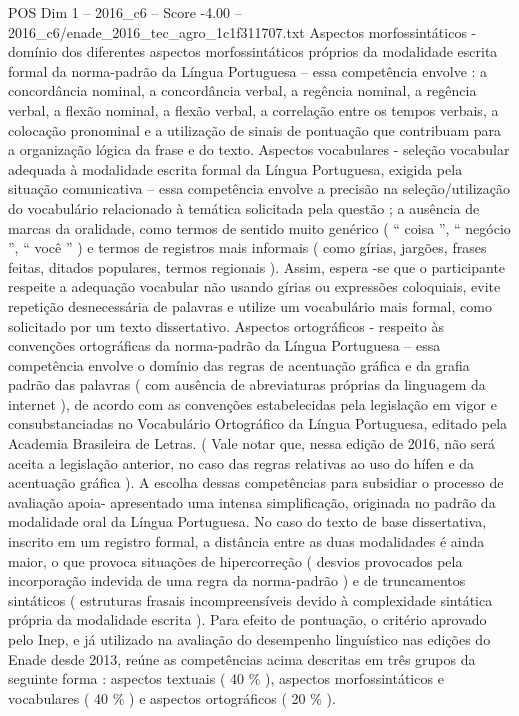 \begin{textsample}{POS Dim 1 – 2016\_c6 – Score -4.00 – 2016\_c6/enade\_2016\_tec\_agro\_1c1f311707.txt}
Aspectos morfossintáticos - domínio dos diferentes aspectos morfossintáticos próprios da modalidade escrita formal da norma-padrão da Língua Portuguesa – essa competência envolve : a concordância nominal, a concordância verbal, a regência nominal, a regência verbal, a flexão nominal, a flexão verbal, a correlação entre os tempos verbais, a colocação pronominal e a utilização de sinais de pontuação que contribuam para a organização lógica da frase e do texto.
Aspectos vocabulares - seleção vocabular adequada à modalidade escrita formal da Língua Portuguesa, exigida pela situação comunicativa – essa competência envolve a precisão na seleção/utilização do vocabulário relacionado à temática solicitada pela questão ; a ausência de marcas da oralidade, como termos de sentido muito genérico ( “ coisa ”, “ negócio ”, “ você ” ) e termos de registros mais informais ( como gírias, jargões, frases feitas, ditados populares, termos regionais ).
Assim, espera -se que o participante respeite a adequação vocabular não usando gírias ou expressões coloquiais, evite repetição desnecessária de palavras e utilize um vocabulário mais formal, como solicitado por um texto dissertativo.
Aspectos ortográficos - respeito às convenções ortográficas da norma-padrão da Língua Portuguesa – essa competência envolve o domínio das regras de acentuação gráfica e da grafia padrão das palavras ( com ausência de abreviaturas próprias da linguagem da internet ), de acordo com as convenções estabelecidas pela legislação em vigor e consubstanciadas no Vocabulário Ortográfico da Língua Portuguesa, editado pela Academia Brasileira de Letras. ( Vale notar que, nessa edição de 2016, não será aceita a legislação anterior, no caso das regras relativas ao uso do hífen e da acentuação gráfica ).
A escolha dessas competências para subsidiar o processo de avaliação apoia- apresentado uma intensa simplificação, originada no padrão da modalidade oral da Língua Portuguesa.
No caso do texto de base dissertativa, inscrito em um registro formal, a distância entre as duas modalidades é ainda maior, o que provoca situações de hipercorreção ( desvios provocados pela incorporação indevida de uma regra da norma-padrão ) e de truncamentos sintáticos ( estruturas frasais incompreensíveis devido à complexidade sintática própria da modalidade escrita ).
Para efeito de pontuação, o critério aprovado pelo Inep, e já utilizado na avaliação do desempenho linguístico nas edições do Enade desde 2013, reúne as competências acima descritas em três grupos da seguinte forma : aspectos textuais ( 40 \% ), aspectos morfossintáticos e vocabulares ( 40 \% ) e aspectos ortográficos ( 20 \% ).

\end{textsample}
